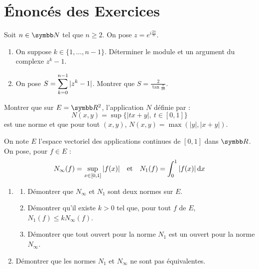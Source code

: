 \section{Énoncés des Exercices}

\begin{exercice}
    Soit $n \in \N$ tel que $n \geqslant 2$. On pose $z = e^{i\frac{2\pi}{n}}$.
    \begin{enumerate}
        \item On suppose $k \in \{1, \dots, n-1\}$. Déterminer le module et un argument du complexe $z^k - 1$.
        \item On pose $\displaystyle S = \sum_{k=0}^{n-1} |z^k - 1|$. Montrer que $S = \frac{2}{\tan \frac{\pi}{2n}}$.
    \end{enumerate}
\end{exercice}

\begin{exercice}
    Montrer que sur $E = \R^2$, l'application $N$ définie par :
    \[N(x,y) = \sup \{ |tx+y|, \ t \in [0,1] \}\]
    est une norme et que pour tout $(x,y)$, $N(x,y) = \max(|y|, |x+y|)$.
\end{exercice}

\begin{exercice}
    On note $E$ l'espace vectoriel des applications continues de $[0,1]$ dans $\R$.
    On pose, pour $f \in E$ :
    \[N_\infty(f) = \sup_{x \in [0,1]} |f(x)| \quad \text{et} \quad N_1(f) = \int_0^1 |f(x)| \,\mathrm{d}x\]
    \begin{enumerate}
        \item 
        \begin{enumerate}
            \item Démontrer que $N_\infty$ et $N_1$ sont deux normes sur $E$.
            \item Démontrer qu'il existe $k > 0$ tel que, pour tout $f$ de $E$, $N_1(f) \leqslant k N_\infty(f)$.
            \item Démontrer que tout ouvert pour la norme $N_1$ est un ouvert pour la norme $N_\infty$.
        \end{enumerate}
        \item Démontrer que les normes $N_1$ et $N_\infty$ ne sont pas équivalentes.
    \end{enumerate}
\end{exercice}

